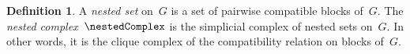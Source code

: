 \documentclass{amsart}
\newtheorem{corollary}[theorem]{Corollary}
\newtheorem{lemma}[theorem]{Lemma}
\theoremstyle{definition}
\newtheorem{definition}[theorem]{Definition}
\newcommand{\ssm}{\smallsetminus} %
\newcommand{\viceversa}{\textit{vice versa}} %
\newcommand{\darkblue}{\color{darkblue}} %
\newcommand{\defn}[1]{\textsl{\darkblue #1}} %
\newcommand{\vincent}[1]{\todo[color=blue!30]{#1 \\ \hfill --- V.}}
\newcommand{\negDisjoint}{\perp} %
\newcommand{\posDisjoint}{\;\top\;} %
\newcommand{\compl}[1]{#1{}^\textsc{c}} %
\begin{document}
\begin{definition}
  \label{def:spineComplex}
  A \defn{nested set} on~$G$ is a set of pairwise compatible blocks of~$G$.
  The \defn{nested complex}~$\nestedComplex$ is the simplicial complex of nested sets on~$G$.
  In other words, it is the clique complex of the compatibility relation on blocks of~$G$.
\end{definition}

%
%
%
%
\end{document}

